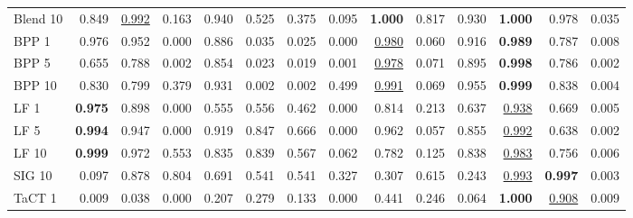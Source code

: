 \begin{table}[htbp]
\begin{adjustbox}{max width=\textwidth}
\begin{tabular}{lrrrrrrrrrrrrr}
Blend 10 & 0.849 & \underline{0.992} & \textcolor{black!45}{0.163} & 0.940 & 0.525 & \textcolor{black!45}{0.375} & \textcolor{black!45}{0.095} & \textbf{1.000} & 0.817 & 0.930 & \textbf{1.000} & 0.978 & \textcolor{black!45}{0.035} \\
BPP 1 & 0.976 & 0.952 & \textcolor{black!45}{0.000} & 0.886 & \textcolor{black!45}{0.035} & \textcolor{black!45}{0.025} & \textcolor{black!45}{0.000} & \underline{0.980} & \textcolor{black!45}{0.060} & 0.916 & \textbf{0.989} & 0.787 & \textcolor{black!45}{0.008} \\
BPP 5 & 0.655 & 0.788 & \textcolor{black!45}{0.002} & 0.854 & \textcolor{black!45}{0.023} & \textcolor{black!45}{0.019} & \textcolor{black!45}{0.001} & \underline{0.978} & \textcolor{black!45}{0.071} & 0.895 & \textbf{0.998} & 0.786 & \textcolor{black!45}{0.002} \\
BPP 10 & 0.830 & 0.799 & \textcolor{black!45}{0.379} & 0.931 & \textcolor{black!45}{0.002} & \textcolor{black!45}{0.002} & \textcolor{black!45}{0.499} & \underline{0.991} & \textcolor{black!45}{0.069} & 0.955 & \textbf{0.999} & 0.838 & \textcolor{black!45}{0.004} \\
LF 1 & \textbf{0.975} & 0.898 & \textcolor{black!45}{0.000} & 0.555 & 0.556 & \textcolor{black!45}{0.462} & \textcolor{black!45}{0.000} & 0.814 & \textcolor{black!45}{0.213} & 0.637 & \underline{0.938} & 0.669 & \textcolor{black!45}{0.005} \\
LF 5 & \textbf{0.994} & 0.947 & \textcolor{black!45}{0.000} & 0.919 & 0.847 & 0.666 & \textcolor{black!45}{0.000} & 0.962 & \textcolor{black!45}{0.057} & 0.855 & \underline{0.992} & 0.638 & \textcolor{black!45}{0.002} \\
LF 10 & \textbf{0.999} & 0.972 & 0.553 & 0.835 & 0.839 & 0.567 & \textcolor{black!45}{0.062} & 0.782 & \textcolor{black!45}{0.125} & 0.838 & \underline{0.983} & 0.756 & \textcolor{black!45}{0.006} \\
SIG 10 & \textcolor{black!45}{0.097} & 0.878 & 0.804 & 0.691 & 0.541 & 0.541 & \textcolor{black!45}{0.327} & \textcolor{black!45}{0.307} & 0.615 & \textcolor{black!45}{0.243} & \underline{0.993} & \textbf{0.997} & \textcolor{black!45}{0.003} \\
TaCT 1 & \textcolor{black!45}{0.009} & \textcolor{black!45}{0.038} & \textcolor{black!45}{0.000} & \textcolor{black!45}{0.207} & \textcolor{black!45}{0.279} & \textcolor{black!45}{0.133} & \textcolor{black!45}{0.000} & \textcolor{black!45}{0.441} & \textcolor{black!45}{0.246} & \textcolor{black!45}{0.064} & \textbf{1.000} & \underline{0.908} & \textcolor{black!45}{0.009} \\

\end{tabular}
\end{adjustbox}
\end{table}
